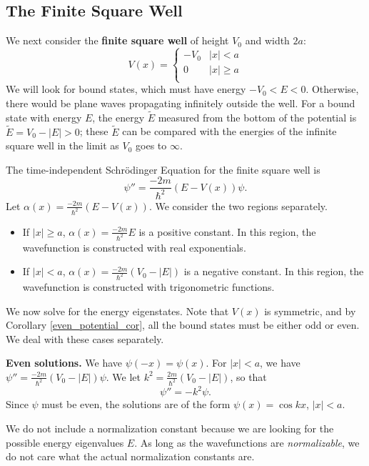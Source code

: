\subsection{The Finite Square Well}\label{finite_square_well}

We next consider the \textbf{finite square well} of height $V_0$ and width $2a$: $$V(x)=
\begin{cases} 
      -V_0 & |x|<a \\
      0& |x|\geq a\\
   \end{cases}$$We will look for bound states, which must have energy $-V_0<E<0$. Otherwise, there would be plane waves propagating infinitely outside the well. For a bound state with energy $E$, the energy $\tilde{E}$ measured from the bottom of the potential is $\tilde{E}=V_0-|E|>0$; these $\tilde{E}$ can be compared with the energies of the infinite square well in the limit as $V_0$ goes to $\infty$.

The time-independent Schrödinger Equation for the finite square well is $$\psi''=\frac{-2m}{\hbar^2}(E-V(x))\psi.$$Let $\alpha(x)=\frac{-2m}{\hbar^2}(E-V(x))$. We consider the two regions separately.

\begin{itemize}
    \item If $|x|\geq a$, $\alpha(x)=\frac{-2m}{\hbar^2}E$ is a positive constant. In this region, the wavefunction is constructed with real exponentials.
    \item If $|x|<a$, $\alpha(x)=\frac{-2m}{\hbar^2}(V_0-|E|)$ is a negative constant. In this region, the wavefunction is constructed with trigonometric functions.
\end{itemize}

We now solve for the energy eigenstates. Note that $V(x)$ is symmetric, and by Corollary \ref{even_potential_cor}, all the bound states must be either odd or even. We deal with these cases separately.

\textbf{Even solutions.} We have $\psi(-x)=\psi(x)$. For $|x|<a$, we have $\psi''=\frac{-2m}{\hbar^2}(V_0-|E|)\psi$. We let $k^2=\frac{2m}{\hbar^2}(V_0-|E|)$, so that $$\psi''=-k^2\psi.$$Since $\psi$ must be even, the solutions are of the form $\psi(x)=\cos kx$, $|x|<a$.

\begin{framedrmk*}
    We do not include a normalization constant because we are looking for the possible energy eigenvalues $E$. As long as the wavefunctions are \textit{normalizable}, we do not care what the actual normalization constants are.
\end{framedrmk*}

